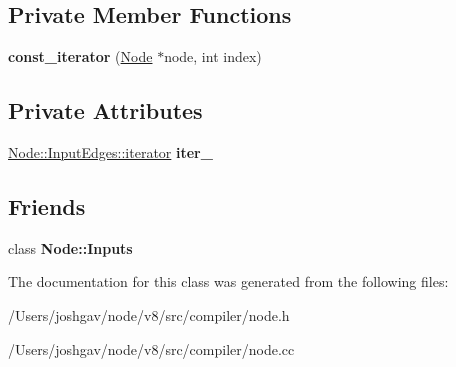 \subsection*{Private Member Functions}
\begin{DoxyCompactItemize}
\item 
{\bfseries const\+\_\+iterator} (\hyperlink{classv8_1_1internal_1_1compiler_1_1_node}{Node} $\ast$node, int index)\hypertarget{classv8_1_1internal_1_1compiler_1_1_node_1_1_inputs_1_1const__iterator_a3e45e8acb15a09151d747d93a9df4e2d}{}\label{classv8_1_1internal_1_1compiler_1_1_node_1_1_inputs_1_1const__iterator_a3e45e8acb15a09151d747d93a9df4e2d}

\end{DoxyCompactItemize}
\subsection*{Private Attributes}
\begin{DoxyCompactItemize}
\item 
\hyperlink{classv8_1_1internal_1_1compiler_1_1_node_1_1_input_edges_1_1iterator}{Node\+::\+Input\+Edges\+::iterator} {\bfseries iter\+\_\+}\hypertarget{classv8_1_1internal_1_1compiler_1_1_node_1_1_inputs_1_1const__iterator_a05f0cacf9027ee0630839c03d558b017}{}\label{classv8_1_1internal_1_1compiler_1_1_node_1_1_inputs_1_1const__iterator_a05f0cacf9027ee0630839c03d558b017}

\end{DoxyCompactItemize}
\subsection*{Friends}
\begin{DoxyCompactItemize}
\item 
class {\bfseries Node\+::\+Inputs}\hypertarget{classv8_1_1internal_1_1compiler_1_1_node_1_1_inputs_1_1const__iterator_ab5632873536c3e0c97344fa0dc6184da}{}\label{classv8_1_1internal_1_1compiler_1_1_node_1_1_inputs_1_1const__iterator_ab5632873536c3e0c97344fa0dc6184da}

\end{DoxyCompactItemize}


The documentation for this class was generated from the following files\+:\begin{DoxyCompactItemize}
\item 
/\+Users/joshgav/node/v8/src/compiler/node.\+h\item 
/\+Users/joshgav/node/v8/src/compiler/node.\+cc\end{DoxyCompactItemize}
